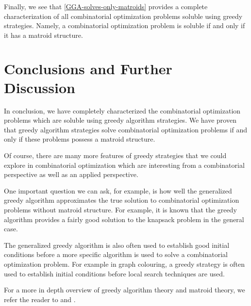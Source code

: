 \documentclass[a4paper,11pt]{report}
\theoremstyle{plain}
\theoremstyle{definition}
\begin{document}
Finally, we see that \autoref{GGA-solves-only-matroids} provides a complete
characterization of all combinatorial optimization problems soluble using
greedy strategies. Namely, a combinatorial optimization problem is soluble
if and only if it has a matroid structure.




\section{Conclusions and Further Discussion}

In conclusion, we have completely characterized the combinatorial optimization
problems which are soluble using greedy algorithm strategies. We have proven
that greedy algorithm strategies solve combinatorial optimization problems if
and only if these problems possess a matroid structure.

Of course, there are many more features of greedy strategies that we could explore
in combinatorial optimization which are interesting from a combinatorial
perspective as well as an applied perspective.

One important question we can ask, for example, is how well the generalized
greedy algorithm approximates the true solution to combinatorial optimization
problems without matroid structure. For example, it is known that the greedy
algorithm provides a fairly good solution to the knapsack problem in the general
case.

The generalized greedy algorithm is also often used to establish good initial
conditions before a more specific algorithm is used to solve a combinatorial
optimization problem. For example in graph colouring, a greedy strategy is often
used to establish initial conditions before local search techniques are used.

For a more in depth overview of greedy algorithm theory and matroid theory,
we refer the reader to \cite{clrs} and \cite{matroid-theory}.

\clearpage


\end{document}
